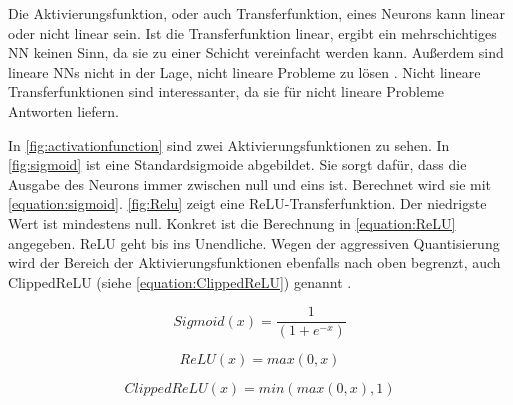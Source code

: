 Die Aktivierungsfunktion, oder auch Transferfunktion, eines Neurons kann linear oder nicht linear sein. Ist die Transferfunktion linear, ergibt ein mehrschichtiges \ac{NN} keinen Sinn, da sie zu einer Schicht vereinfacht werden kann. Außerdem sind lineare \acp{NN} nicht in der Lage, nicht lineare Probleme zu lösen \cite{minsky1969perceptron}. Nicht lineare Transferfunktionen sind interessanter, da sie für nicht lineare Probleme Antworten liefern.

In \autoref{fig:activationfunction} sind zwei Aktivierungsfunktionen zu sehen. In \autoref{fig:sigmoid} ist eine Standardsigmoide abgebildet. Sie sorgt dafür, dass die Ausgabe des Neurons immer zwischen null und eins ist. Berechnet wird sie mit \autoref{equation:sigmoid}. \autoref{fig:Relu} zeigt eine \ac{ReLU}-Transferfunktion. Der niedrigste Wert ist mindestens null. Konkret ist die Berechnung in \autoref{equation:ReLU} angegeben. \ac{ReLU} geht bis ins Unendliche. Wegen der aggressiven Quantisierung wird der Bereich der Aktivierungsfunktionen ebenfalls nach oben begrenzt, auch Clipped\ac{ReLU} (siehe \autoref{equation:ClippedReLU}) genannt \cite{StockfishNNUE}.

\begin{equation}
  Sigmoid(x)=\frac{1}{(1+e^{-x})}
  \label{equation:sigmoid}
\end{equation}

\begin{equation}
  ReLU(x)=max(0,x)
  \label{equation:ReLU}
\end{equation}

\begin{equation}
  ClippedReLU(x)=min(max(0,x),1)
  \label{equation:ClippedReLU}
\end{equation}

